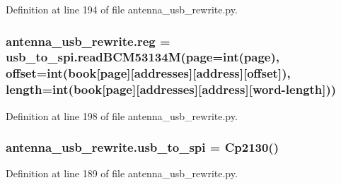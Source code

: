 Definition at line 194 of file antenna\+\_\+usb\+\_\+rewrite.\+py.

\subsubsection[{\texorpdfstring{reg}{reg}}]{\setlength{\rightskip}{0pt plus 5cm}antenna\+\_\+usb\+\_\+rewrite.\+reg = usb\+\_\+to\+\_\+spi.\+read\+B\+C\+M53134M(page=int(page), offset=int({\bf book}\mbox{[}page\mbox{]}\mbox{[}\textquotesingle{}addresses\textquotesingle{}\mbox{]}\mbox{[}address\mbox{]}\mbox{[}\textquotesingle{}offset\textquotesingle{}\mbox{]}), length=int({\bf book}\mbox{[}page\mbox{]}\mbox{[}\textquotesingle{}addresses\textquotesingle{}\mbox{]}\mbox{[}address\mbox{]}\mbox{[}\textquotesingle{}word-\/length\textquotesingle{}\mbox{]}))}\hypertarget{namespaceantenna__usb__rewrite_af962b1046a96d9997df0dd7e5e3a8da9}{}\label{namespaceantenna__usb__rewrite_af962b1046a96d9997df0dd7e5e3a8da9}


Definition at line 198 of file antenna\+\_\+usb\+\_\+rewrite.\+py.

\subsubsection[{\texorpdfstring{usb\+\_\+to\+\_\+spi}{usb_to_spi}}]{\setlength{\rightskip}{0pt plus 5cm}antenna\+\_\+usb\+\_\+rewrite.\+usb\+\_\+to\+\_\+spi = {\bf Cp2130}()}\hypertarget{namespaceantenna__usb__rewrite_ad962032e05d30ea5e906fa3535a0e2f3}{}\label{namespaceantenna__usb__rewrite_ad962032e05d30ea5e906fa3535a0e2f3}


Definition at line 189 of file antenna\+\_\+usb\+\_\+rewrite.\+py.

